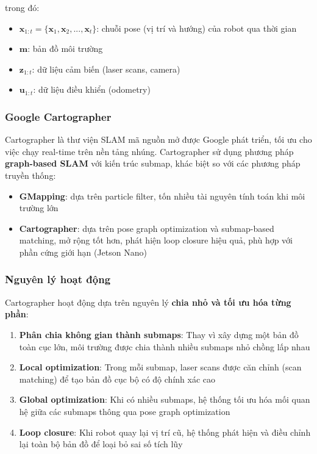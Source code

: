 trong đó:
\begin{itemize}
    \item $\mathbf{x}_{1:t} = \{\mathbf{x}_1, \mathbf{x}_2, ..., \mathbf{x}_t\}$: chuỗi pose (vị trí và hướng) của robot qua thời gian
    \item $\mathbf{m}$: bản đồ môi trường
    \item $\mathbf{z}_{1:t}$: dữ liệu cảm biến (laser scans, camera)
    \item $\mathbf{u}_{1:t}$: dữ liệu điều khiển (odometry)
\end{itemize}

\subsubsection{Google Cartographer}

Cartographer \cite{hess2016cartographer} là thư viện SLAM mã nguồn mở được Google phát triển, tối ưu cho việc chạy real-time trên nền tảng nhúng. Cartographer sử dụng phương pháp \textbf{graph-based SLAM} với kiến trúc submap, khác biệt so với các phương pháp truyền thống:

\begin{itemize}
    \item \textbf{GMapping}: dựa trên particle filter, tốn nhiều tài nguyên tính toán khi môi trường lớn
    \item \textbf{Cartographer}: dựa trên pose graph optimization và submap-based matching, mở rộng tốt hơn, phát hiện loop closure hiệu quả, phù hợp với phần cứng giới hạn (Jetson Nano)
\end{itemize}

\subsubsection{Nguyên lý hoạt động}

Cartographer hoạt động dựa trên nguyên lý \textbf{chia nhỏ và tối ưu hóa từng phần}:

\begin{enumerate}
    \item \textbf{Phân chia không gian thành submaps}: Thay vì xây dựng một bản đồ toàn cục lớn, môi trường được chia thành nhiều submaps nhỏ chồng lấp nhau

    \item \textbf{Local optimization}: Trong mỗi submap, laser scans được căn chỉnh (scan matching) để tạo bản đồ cục bộ có độ chính xác cao

    \item \textbf{Global optimization}: Khi có nhiều submaps, hệ thống tối ưu hóa mối quan hệ giữa các submaps thông qua pose graph optimization

    \item \textbf{Loop closure}: Khi robot quay lại vị trí cũ, hệ thống phát hiện và điều chỉnh lại toàn bộ bản đồ để loại bỏ sai số tích lũy
\end{enumerate}

